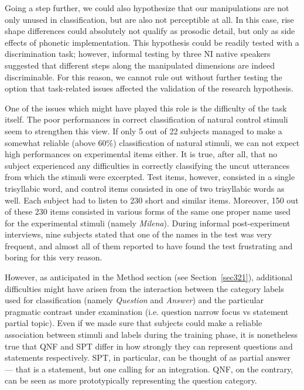 Going a step further, we could also hypothesize that our manipulations are not only unused in classification, but are also not perceptible at all. In this case, rise shape differences could absolutely not qualify as prosodic detail, but only as side effects of phonetic implementation. This hypothesis could be readily tested with a discrimination task; however, informal testing by three NI native speakers suggested that different steps along the manipulated dimensions are indeed discriminable. For this reason, we cannot rule out without further testing the option that task-related issues affected the validation of the research hypothesis. 

One of the issues which might have played this role is the difficulty of the task itself. The poor performances in correct classification of natural control stimuli seem to strengthen this view. If only 5 out of 22 subjects managed to make a somewhat reliable (above 60\%) classification of natural stimuli, we can not expect high performances on experimental items either. It is true, after all, that no subject experienced any difficulties in correctly classifying the uncut utterances from which the stimuli were excerpted. Test items, however, consisted in a single trisyllabic word, and control items consisted in one of two trisyllabic words as well. Each subject had to listen to 230 short and similar items. Moreover, 150 out of these 230 items consisted in various forms of the same one proper name used for the experimental stimuli (namely \textit{Milena}). During informal post-experiment interviews, nine subjects stated that one of the names in the test was very frequent, and almost all of them reported to have found the test frustrating and boring for this very reason.

However, as anticipated in the Method section (see Section~\ref{sec321}), additional difficulties might have arisen from the interaction between the category labels used for classification (namely \textit{Question} and \textit{Answer}) and the particular pragmatic contrast under examination (i.e. question narrow focus vs statement partial topic). Even if we made sure that subjects could make a reliable association between stimuli and labels during the training phase, it is nonetheless true that QNF and SPT differ in how strongly they can represent questions and statements respectively. SPT, in particular, can be thought of as partial answer --- that is a statement, but one calling for an integration. QNF, on the contrary, can be seen as more prototypically representing the question category.

